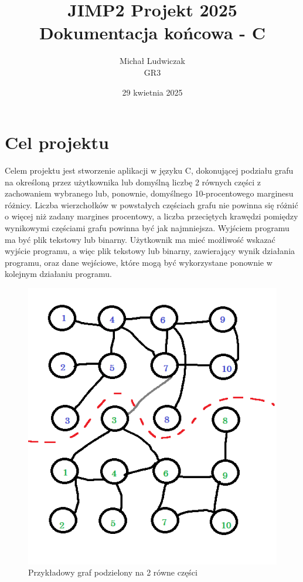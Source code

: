 \documentclass{article}
\title{\Huge JIMP2 Projekt 2025 \\ {\huge Dokumentacja końcowa - C}}
\author{Michał Ludwiczak \\ GR3}
\date{29 kwietnia 2025}
\begin{document}
\maketitle

\tableofcontents



\section{Cel projektu}

Celem projektu jest stworzenie aplikacji w języku C, dokonującej podziału grafu na określoną przez użytkownika lub domyślną liczbę 2 równych części z zachowaniem wybranego lub, ponownie, domyślnego 10-procentowego marginesu różnicy. Liczba wierzchołków w powstałych częściach grafu nie powinna się różnić o więcej niż zadany margines procentowy, a liczba przeciętych krawędzi pomiędzy wynikowymi częściami grafu powinna być jak najmniejsza. Wyjściem programu ma być plik tekstowy lub binarny. Użytkownik ma mieć możliwość wskazać wyjście programu, a więc plik tekstowy lub binarny, zawierający wynik działania programu, oraz dane wejściowe, które mogą być wykorzystane ponownie w kolejnym działaniu programu.



\begin{figure}[ht]
    \centering
    \includegraphics[width=0.75\linewidth]{img/graph.png}
    \caption{Przykładowy graf podzielony na 2 równe części}
    \label{fig:graph}
\end{figure}
\end{document}
